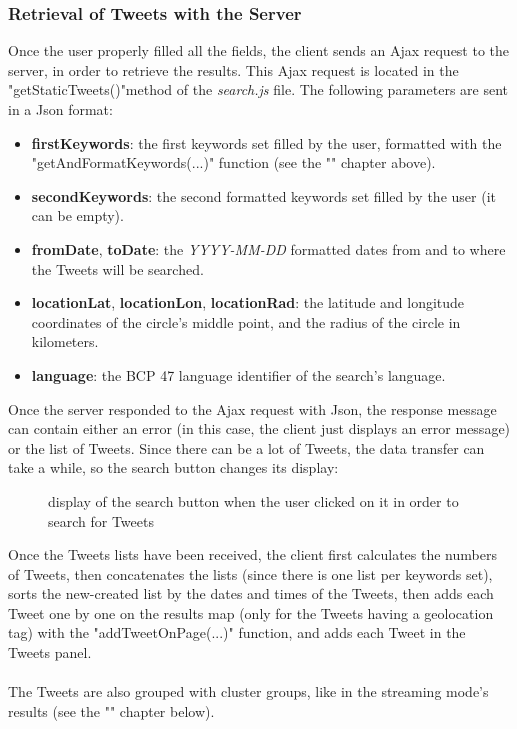 \documentclass[a4paper,11pt]{report}
\begin{document}
\subsubsection{Retrieval of Tweets with the Server}
\label{retrievalOfTweets}
Once the user properly filled all the fields, the client sends an Ajax request to the server, in order to retrieve the results. This Ajax request is located in the "getStaticTweets()"method of the \emph{search.js} file. The following parameters are sent in a Json format:
\begin{itemize}
	\item \textbf{firstKeywords}: the first keywords set filled by the user, formatted with the "getAndFormatKeywords(...)" function (see the "" chapter above).
	\item \textbf{secondKeywords}: the second formatted keywords set filled by the user (it can be empty).
	\item \textbf{fromDate}, \textbf{toDate}: the \emph{YYYY-MM-DD} formatted dates from and to where the Tweets will be searched.
	\item \textbf{locationLat}, \textbf{locationLon}, \textbf{locationRad}: the latitude and longitude coordinates of the circle's middle point, and the radius of the circle in kilometers.
	\item \textbf{language}: the BCP 47 language identifier of the search's language.
\end{itemize}

Once the server responded to the Ajax request with Json, the response message can contain either an error (in this case, the client just displays an error message) or the list of Tweets. Since there can be a lot of Tweets, the data transfer can take a while, so the search button changes its display:
\begin{figure}[H]
\vspace{-5pt}
\begin{center}
\vspace{-20pt}
\caption{display of the search button when the user clicked on it 
in order to search for Tweets}
\end{center}
\end{figure}
\vspace{-10pt}

Once the Tweets lists have been received, the client first calculates the numbers of Tweets, then concatenates the lists (since there is one list per keywords set), sorts the new-created list by the dates and times of the Tweets, then adds each Tweet one by one on the results map (only for the Tweets having a geolocation tag) with the "addTweetOnPage(...)" function, and adds each Tweet in the Tweets panel.\\\\
The Tweets are also grouped with cluster groups, like in the streaming mode's results (see the "" chapter below).
\bigskip
\end{document}
